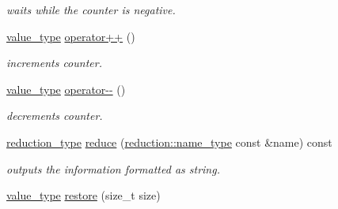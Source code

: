 \begin{DoxyCompactItemize}
\begin{DoxyCompactList}\small\item\em waits while the counter is negative. \end{DoxyCompactList}\item 
\hypertarget{classhryky_1_1exclusion_1_1_counter_a245ec8efe4f40cae84ec505aa3a684a9}{\hyperlink{classhryky_1_1exclusion_1_1_counter_ab326191a15b6c67f8071a7a2b138d1f0}{value\-\_\-type} \hyperlink{classhryky_1_1exclusion_1_1_counter_a245ec8efe4f40cae84ec505aa3a684a9}{operator++} ()}\label{classhryky_1_1exclusion_1_1_counter_a245ec8efe4f40cae84ec505aa3a684a9}

\begin{DoxyCompactList}\small\item\em increments counter. \end{DoxyCompactList}\item 
\hypertarget{classhryky_1_1exclusion_1_1_counter_a04f1e65f483c087de59ff208262472a4}{\hyperlink{classhryky_1_1exclusion_1_1_counter_ab326191a15b6c67f8071a7a2b138d1f0}{value\-\_\-type} \hyperlink{classhryky_1_1exclusion_1_1_counter_a04f1e65f483c087de59ff208262472a4}{operator-\/-\/} ()}\label{classhryky_1_1exclusion_1_1_counter_a04f1e65f483c087de59ff208262472a4}

\begin{DoxyCompactList}\small\item\em decrements counter. \end{DoxyCompactList}\item 
\hypertarget{classhryky_1_1exclusion_1_1_counter_afc58617ec70e839062556aeec2e6963c}{\hyperlink{namespacehryky_a343a9a4c36a586be5c2693156200eadc}{reduction\-\_\-type} \hyperlink{classhryky_1_1exclusion_1_1_counter_afc58617ec70e839062556aeec2e6963c}{reduce} (\hyperlink{namespacehryky_1_1reduction_ac686c30a4c8d196bbd0f05629a6b921f}{reduction\-::name\-\_\-type} const \&name) const }\label{classhryky_1_1exclusion_1_1_counter_afc58617ec70e839062556aeec2e6963c}

\begin{DoxyCompactList}\small\item\em outputs the information formatted as string. \end{DoxyCompactList}\item 
\hypertarget{classhryky_1_1exclusion_1_1_counter_a749e52586184cd093961048f4000d267}{\hyperlink{classhryky_1_1exclusion_1_1_counter_ab326191a15b6c67f8071a7a2b138d1f0}{value\-\_\-type} \hyperlink{classhryky_1_1exclusion_1_1_counter_a749e52586184cd093961048f4000d267}{restore} (size\-\_\-t size)}\label{classhryky_1_1exclusion_1_1_counter_a749e52586184cd093961048f4000d267}


\end{DoxyCompactItemize}

